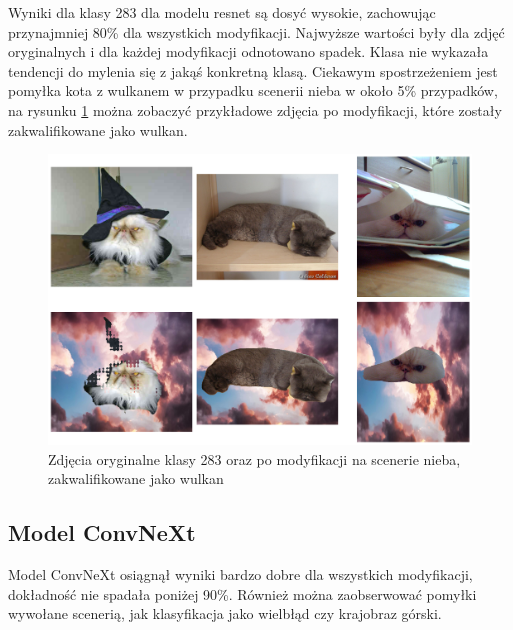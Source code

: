 Wyniki dla klasy 283 dla modelu resnet są dosyć wysokie, zachowując przynajmniej 80\% dla wszystkich modyfikacji. Najwyższe wartości były dla zdjęć oryginalnych i dla każdej modyfikacji odnotowano spadek. Klasa nie wykazała tendencji do mylenia się
z jakąś konkretną klasą. Ciekawym spostrzeżeniem jest pomyłka kota z wulkanem w przypadku scenerii nieba w około 5\% przypadków, na rysunku \ref*{rys:vulcan} można zobaczyć przykładowe zdjęcia po modyfikacji, które zostały zakwalifikowane jako wulkan. 

\begin{figure}
	\centering\includegraphics[width=.9\textwidth]{img/vulcan}
	\caption{Zdjęcia oryginalne klasy 283 oraz po modyfikacji na scenerie nieba, zakwalifikowane jako wulkan}
	\label{rys:vulcan}
\end{figure}

\subsection*{Model ConvNeXt}

Model ConvNeXt osiągnął wyniki bardzo dobre dla wszystkich modyfikacji, dokładność nie spadała poniżej 90\%. Również można zaobserwować pomyłki wywołane scenerią, jak klasyfikacja jako wielbłąd czy krajobraz górski.

